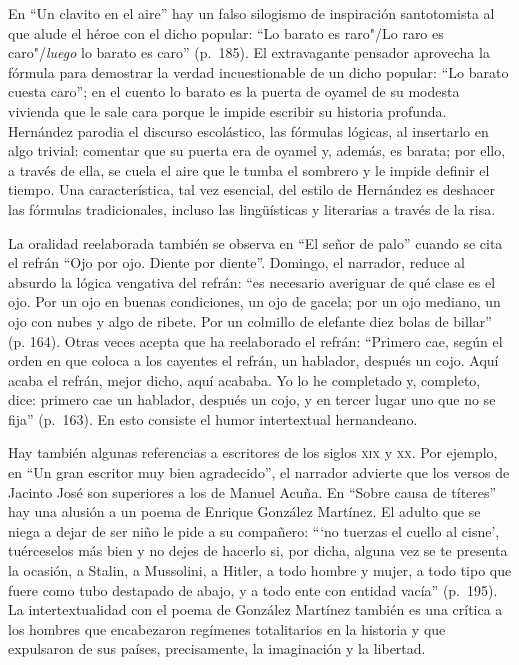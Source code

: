 \documentclass[14pt,twoside,final]{extbook} %
\begin{document}
En ``Un clavito en el aire'' hay un falso silogismo de inspiración santotomista al que alude el héroe con el dicho popular: ``Lo barato es raro"/Lo raro es caro"/\emph{luego} lo barato es caro'' (p.~185). El extravagante pensador aprovecha la fórmula para demostrar la verdad incuestionable de un dicho popular: ``Lo barato cuesta caro''; en el cuento lo barato es la puerta de oyamel de su modesta vivienda que le sale cara porque le impide escribir su historia profunda. Hernández parodia el discurso escolástico, las fórmulas lógicas, al insertarlo en algo trivial: comentar que su puerta era de oyamel y, además, es barata; por ello, a través de ella, se cuela el aire que le tumba el sombrero y le impide definir el tiempo. Una característica, tal vez esencial, del estilo de Hernández es deshacer las fórmulas tradicionales, incluso las lingüísticas y literarias a través de la risa.

La oralidad reelaborada también se observa en ``El señor de palo'' cuando se cita el refrán ``Ojo por ojo. Diente por diente''. Domingo, el narrador, reduce al absurdo la lógica vengativa del refrán: ``es necesario averiguar de qué clase es el ojo. Por un ojo en buenas condiciones, un ojo de gacela; por un ojo mediano, un ojo con nubes y algo de ribete. Por un colmillo de elefante diez bolas de billar'' (p. 164). Otras veces acepta que ha reelaborado el refrán: ``Primero cae, según el orden en que coloca a los cayentes el refrán, un hablador, después un cojo. Aquí acaba el refrán, mejor dicho, aquí acababa. Yo lo he completado y, completo, dice: primero cae un hablador, después un cojo, y en tercer lugar uno que no se fija'' (p.~163). En esto consiste el humor intertextual hernandeano.

Hay también algunas referencias a escritores de los siglos \textsc{xix} y \textsc{xx}. Por ejemplo, en ``Un gran escritor muy bien agradecido'', el narrador advierte que los versos de Jacinto José son superiores a los de Manuel Acuña. En ``Sobre causa de títeres'' hay una alusión a un poema de Enrique González Martínez. El adulto que se niega a dejar de ser niño le pide a su compañero: ``{}`no tuerzas el cuello al cisne', tuérceselos más bien y no dejes de hacerlo si, por dicha, alguna vez se te presenta la ocasión, a Stalin, a Mussolini, a Hitler, a todo hombre y mujer, a todo tipo que fuere como tubo destapado de abajo, y a todo ente con entidad vacía'' (p.~195). La intertextualidad con el poema de González Martínez también es una crítica a los hombres que encabezaron regímenes totalitarios en la historia y que expulsaron de sus países, precisamente, la imaginación y la libertad.
\end{document}
